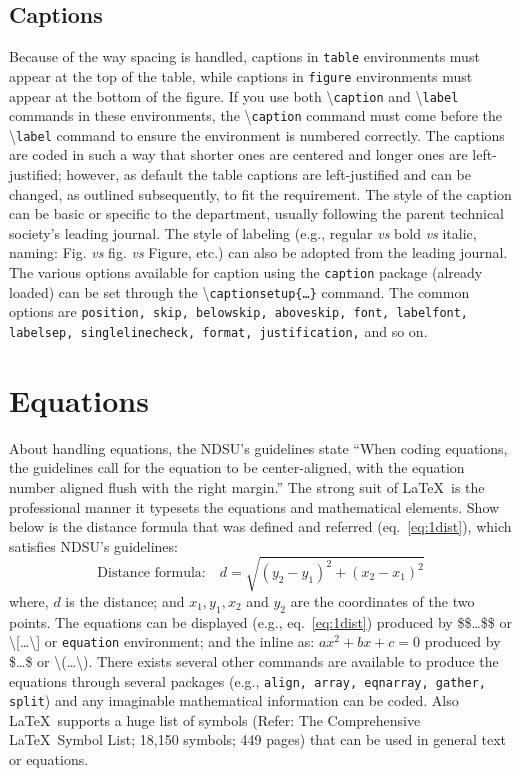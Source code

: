 \documentclass{article}
\newcommand\cmd[1]{\textbackslash\texttt{#1}}
\newcommand\ix[1]{#1\index{#1}} %
\begin{document}
\subsection{Captions}
Because of the way spacing is handled, \ix{caption}s in \texttt{table} environments must appear at the top of the table, while captions in \texttt{figure} environments must appear at the bottom of the figure. If you use both \cmd{caption} and \cmd{label} commands in these environments, the \cmd{caption} command must come before the \cmd{label} command to ensure the environment is numbered correctly. The captions are coded in such a way that shorter ones are centered and longer ones are left-justified; however, as default the table captions are left-justified and can be changed,  as outlined subsequently, to fit the requirement.  The style of the caption can be basic or specific to the department, usually following the parent technical society's leading journal. The style of labeling (e.g., regular \emph{vs} bold \emph{vs} italic, naming: Fig. \emph{vs} fig. \emph{vs} Figure, etc.) can also be adopted from the leading journal. The various options available for caption using the \texttt{caption} package (already loaded) can be set through the \cmd{\ix{captionsetup}\{\ldots\}} command. The common options are \texttt{position, skip, belowskip, aboveskip, font, labelfont, labelsep, singlelinecheck, format, justification,} and so on.  

\section{Equations}
About handling \ix{equation}s, the NDSU's guidelines state ``When coding equations, the guidelines call for the equation to be center-aligned, with the equation number aligned flush with the right margin.'' The strong suit of \LaTeX\ is the professional manner it typesets the equations and mathematical elements. Show below is the distance formula that was defined and referred (eq.~\ref{eq:1dist}), which satisfies NDSU's guidelines:
\begin{equation}
\text{Distance formula:} \quad d = \sqrt{(y_2-y_1)^2+(x_2-x_1)^2}
\label{eq:1dist}
\end{equation}
\noindent where, $d$ is the distance; and $x_1, y_1, x_2$ and $y_2$ are the coordinates of the two points. The equations can be displayed (e.g., eq.~\ref{eq:1dist}) produced by \$\$\ldots\$\$ or \textbackslash[\ldots\textbackslash] or \texttt{equation} environment; and the inline as: $ax^2 + bx + c = 0$ produced by \$\ldots\$ or \textbackslash(\ldots\textbackslash). There exists several other commands are available to produce the equations through several packages (e.g., \texttt{align, array, eqnarray, gather, split}) and any imaginable mathematical information can be coded. Also \LaTeX\ supports a huge list of symbols (Refer: The Comprehensive \LaTeX\ Symbol List; 18,150 symbols; 449 pages) that can be used in general text or equations.
\end{document}
